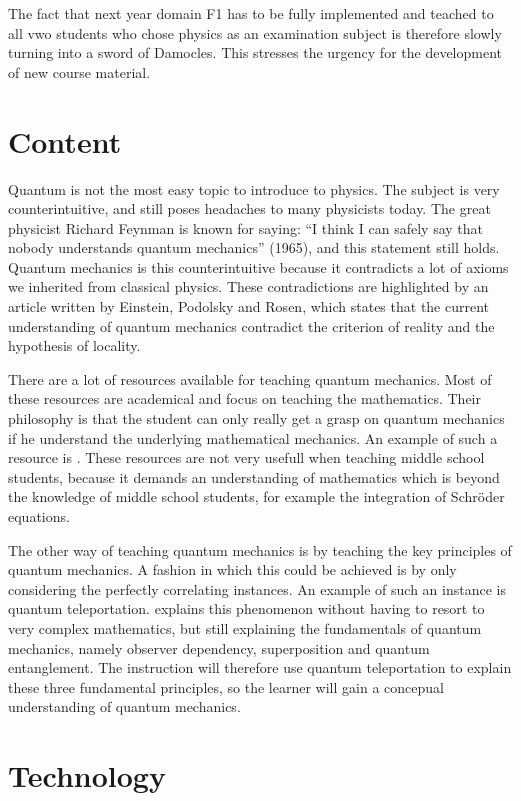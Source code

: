 \documentclass[12pt]{report} %
\begin{document}
The fact that next year domain F1 has to be fully implemented and teached to all vwo students who chose physics as an examination subject is therefore slowly turning into a sword of Damocles. This stresses the urgency for the development of new course material.

\section{Content}

Quantum is not the most easy topic to introduce to physics. The subject is very counterintuitive, and still poses headaches to many physicists today. The great physicist Richard Feynman is known for saying: “I think I can safely say that nobody understands quantum mechanics” (1965), and this statement still holds. Quantum mechanics is this counterintuitive because it contradicts a lot of axioms we inherited from classical physics. These contradictions are highlighted by an article written by Einstein, Podolsky and Rosen, which states that the current understanding of quantum mechanics contradict the criterion of reality and the hypothesis of locality.

There are a lot of resources available for teaching quantum mechanics. Most of these resources are academical and focus on teaching the mathematics. Their philosophy is that the student can only really get a grasp on quantum mechanics if he understand the underlying mathematical mechanics. An example of such a resource is . These resources are not very usefull when teaching middle school students, because it demands an understanding of mathematics which is beyond the knowledge of middle school students, for example the integration of Schröder equations.

The other way of teaching quantum mechanics is by teaching the key principles of quantum mechanics. A fashion in which this could be achieved is by only considering the perfectly correlating instances. An example of such an instance is quantum teleportation.  explains this phenomenon without having to resort to very complex mathematics, but still explaining the fundamentals of quantum mechanics, namely observer dependency, superposition and quantum entanglement. The instruction will therefore use quantum teleportation to explain these three fundamental principles, so the learner will gain a concepual understanding of quantum mechanics.

\section{Technology}
\end{document}
